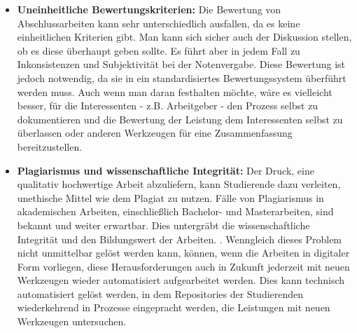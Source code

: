 \documentclass[conference]{IEEEtran}
\begin{document}
\begin{itemize}[leftmargin=*]
    \item \textbf{Uneinheitliche Bewertungskriterien:}
    \newline Die Bewertung von Abschlussarbeiten kann sehr unterschiedlich ausfallen, da es keine einheitlichen Kriterien gibt. Man kann sich sicher auch der Diskussion stellen, ob es diese überhaupt geben sollte. Es führt aber in jedem Fall zu Inkonsistenzen und Subjektivität bei der Notenvergabe. Diese Bewertung ist jedoch notwendig, da sie in ein standardisiertes Bewertungssystem überführt werden muss. Auch wenn man daran festhalten möchte, wäre es vielleicht besser, für die Interessenten - z.B. Arbeitgeber - den Prozess selbst zu dokumentieren und die Bewertung der Leistung dem Interessenten selbst zu überlassen oder anderen Werkzeugen für eine Zusammenfassung bereitzustellen. 

    \item \textbf{Plagiarismus und wissenschaftliche Integrität:}
    \newline Der Druck, eine qualitativ hochwertige Arbeit abzuliefern, kann Studierende dazu verleiten, unethische Mittel wie dem Plagiat zu nutzen. Fälle von Plagiarismus in akademischen Arbeiten, einschließlich Bachelor- und Masterarbeiten, sind bekannt und weiter erwartbar. Dies untergräbt die wissenschaftliche Integrität und den Bildungswert der Arbeiten. \cite{Larsson2013}. Wenngleich dieses Problem nicht unmittelbar gelöst werden kann, können, wenn die Arbeiten in digitaler Form vorliegen, diese Herausforderungen auch in Zukunft jederzeit mit neuen Werkzeugen wieder automatisiert aufgearbeitet werden. Dies kann technisch automatisiert gelöst werden, in dem Repositories der Studierenden wiederkehrend in Prozesse eingepracht werden, die Leistungen mit neuen Werkzeugen untersuchen.


\end{itemize}
\end{document}
